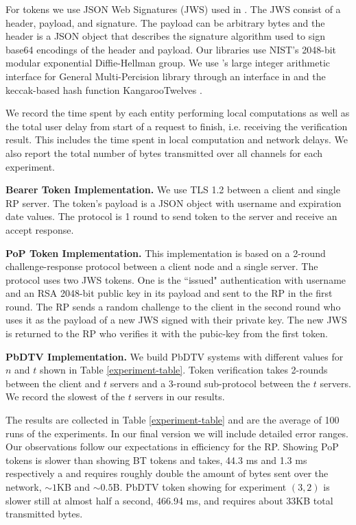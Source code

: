 \documentclass[conference]{IEEEtran}
\begin{document}
For tokens we use JSON Web Signatures (JWS) \cite{jws-rfc7515} %
used in \cite{openIDConnect,rfc6749OAuth2.0}. The JWS consist of a header, payload, and signature. The payload can be arbitrary bytes and the header is a JSON object that describes the signature algorithm used to sign base64 encodings of the header and payload. Our libraries use NIST’s 2048-bit modular exponential Diffie-Hellman group. We use \cite{pycrypto}'s large integer arithmetic interface for General Multi-Percision library through an interface in and the keccak-based hash function KangarooTwelves \cite{Bertoni2018KangarooTwelveFH}.

We record the time spent by each entity performing local computations as well as the total user delay from start of a request to finish, i.e. receiving the verification result. This includes the time spent in local computation and network delays. We also report the total number of bytes transmitted over all channels for each experiment. 

\noindent \textbf{Bearer Token Implementation.} We use TLS 1.2 between a client and single RP server. The token's payload is a JSON object with username and expiration date values. The protocol is 1 round to send token to the server and receive an accept response. %


\noindent \textbf{PoP Token Implementation.} This implementation is based on a 2-round challenge-response protocol \cite{rfc8705} between a client node and a single server. The protocol uses two JWS tokens. One is the ``issued" authentication with username and an RSA 2048-bit public key in its payload and sent to the RP in the first round. The RP sends a random challenge to the client in the second round who uses it as the payload of a new JWS signed with their private key. The new JWS is returned to the RP who verifies it with the pubic-key from the first token.

\noindent \textbf{PbDTV Implementation.}
We build PbDTV systems with different values for $n$ and $t$ shown in Table \ref{experiment-table}. Token verification takes 2-rounds between the client and $t$ servers and a 3-round sub-protocol between the $t$ servers. We record the slowest of the $t$ servers in our results.

The results are collected in Table \ref{experiment-table} and are the average of 100 runs of the experiments. In our final version we will include detailed error ranges. Our observations follow our expectations in efficiency for the RP. Showing PoP tokens is slower %
than showing BT tokens and takes, 44.3 ms and 1.3 ms respectively a %
and requires roughly double the amount of bytes sent over the network, $\sim1$KB and $\sim0.5$B. PbDTV token showing for experiment $(3, 2)$ is  slower still at almost half a second, 466.94 ms, and requires about 33KB total transmitted bytes. %
\end{document}
